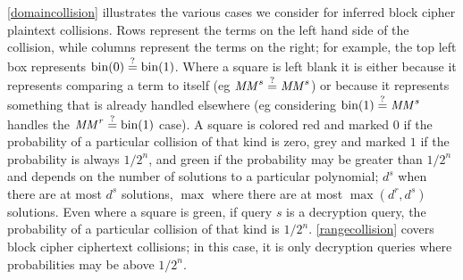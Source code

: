 \documentclass[hctr2.tex]{subfiles}
\begin{document}
\autoref{domaincollision} illustrates the various cases
we consider for inferred block cipher plaintext collisions.
Rows represent the terms
on the left hand side of the collision, while
columns represent the terms on the right; 
for example, the top left box represents
\(\operatorname{bin}(0) \stackrel{\text{?}}{=} \operatorname{bin}(1)\). Where a square is left blank
it is either because it represents
comparing a term to itself (eg \(\mathit{MM}^s \stackrel{\text{?}}{=} \mathit{MM}^s\))
or because it represents something that
is already handled elsewhere
(eg considering \(\operatorname{bin}(1) \stackrel{\text{?}}{=} \mathit{MM}^s\)
handles the \(\mathit{MM}^r \stackrel{\text{?}}{=} \operatorname{bin}(1)\) case).
A square is colored red
and marked \(0\) if the
probability of a particular collision
of that kind is zero, grey
and marked \(1\) if
the probability is always \(1/2^n\),
and green if the probability may be
greater than \(1/2^n\) and depends
on the number of solutions to a
particular polynomial;
\(d^s\) when there are at most \(d^s\) solutions,
\(\max\) where there are at most
\(\max(d^r, d^s)\) solutions.
Even where a square is green,
if query \(s\) is a decryption query,
the probability of a particular collision of
that kind is \(1/2^n\).
\autoref{rangecollision} covers
block cipher ciphertext collisions; in this case,
it is only decryption queries where
probabilities may be above \(1/2^n\).
\end{document}
